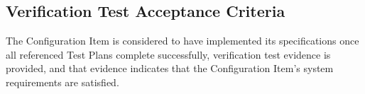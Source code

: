 \subsection{Verification Test Acceptance Criteria}
The Configuration Item is considered to have implemented its specifications
once all referenced Test Plans complete successfully, verification test
evidence is provided, and that evidence indicates that the Configuration Item's
system requirements are satisfied.